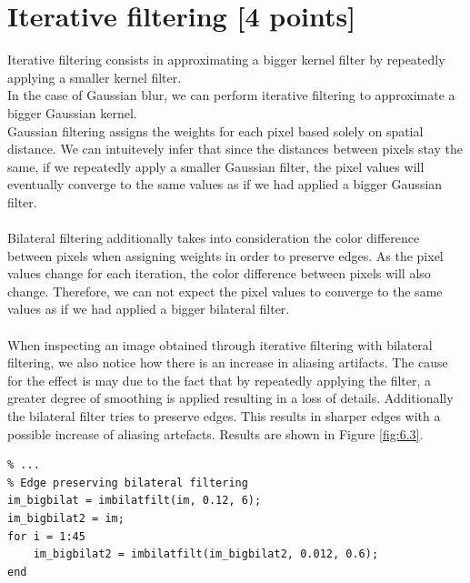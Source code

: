 \documentclass[tikz,14pt,fleqn]{article}
\begin{document}
\section{Iterative filtering [4 points]}
Iterative filtering consists in approximating a bigger kernel filter by repeatedly applying a smaller kernel filter.\\
In the case of Gaussian blur, we can perform iterative filtering to approximate a bigger Gaussian kernel.\\
Gaussian filtering assigns the weights for each pixel based solely on spatial distance. We can intuitevely infer that since the distances between pixels stay the same, if we repeatedly apply a smaller Gaussian filter, the pixel values will eventually converge to the same values as if we had applied a bigger Gaussian filter.\\\\
Bilateral filtering additionally takes into consideration the color difference between pixels when assigning weights in order to preserve edges. As the pixel values change for each iteration, the color difference between pixels will also change. Therefore, we can not expect the pixel values to converge to the same values as if we had applied a bigger bilateral filter.\\\\
When inspecting an image obtained through iterative filtering with bilateral filtering, we also notice how there is an increase in aliasing artifacts. The cause for the effect is may due to the fact that by repeatedly applying the filter, a greater degree of smoothing is applied resulting in a loss of details. Additionally the bilateral filter tries to preserve edges. This results in sharper edges with a possible increase of aliasing artefacts. Results are shown in Figure \ref{fig:6.3}.
\vspace*{-0.5cm}
\begin{verbatim} 
% ...
% Edge preserving bilateral filtering
im_bigbilat = imbilatfilt(im, 0.12, 6);
im_bigbilat2 = im;
for i = 1:45
    im_bigbilat2 = imbilatfilt(im_bigbilat2, 0.012, 0.6);
end
\end{verbatim}
\vspace*{-0.5cm}
\end{document}
